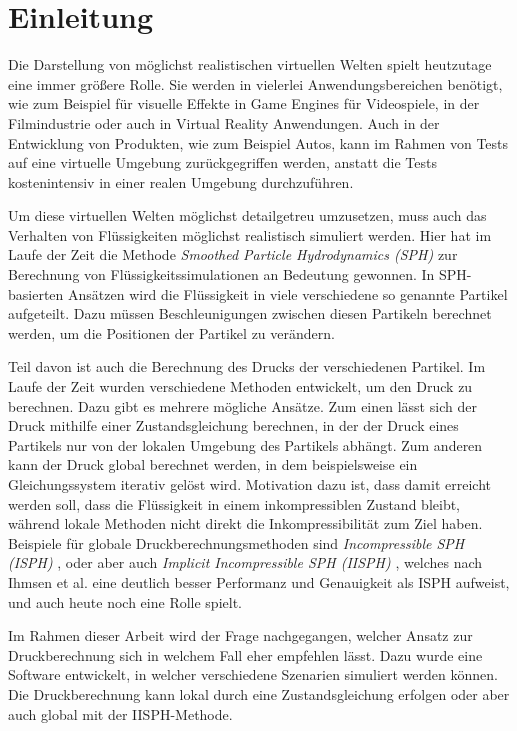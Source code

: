 \documentclass[11pt,
a4paper,
parskip=half, %
BCOR=10mm, %
english,
ngerman]{scrreprt}
\begin{document}
\chapter{Einleitung}
Die Darstellung von möglichst realistischen virtuellen Welten spielt heutzutage eine immer größere Rolle.
Sie werden in vielerlei Anwendungsbereichen benötigt,
wie zum Beispiel für visuelle Effekte in Game Engines für Videospiele, in der Filmindustrie oder auch in Virtual Reality Anwendungen.
Auch in der Entwicklung von Produkten, wie zum Beispiel Autos, kann im Rahmen von Tests auf eine virtuelle Umgebung zurückgegriffen werden,
anstatt die Tests kostenintensiv in einer realen Umgebung durchzuführen.

Um diese virtuellen Welten möglichst detailgetreu umzusetzen, muss auch das Verhalten von Flüssigkeiten möglichst realistisch simuliert werden.
Hier hat im Laufe der Zeit die Methode \textit{Smoothed Particle Hydrodynamics (SPH)} zur Berechnung von Flüssigkeitssimulationen an Bedeutung gewonnen.
In SPH-basierten Ansätzen wird die Flüssigkeit in viele verschiedene so genannte Partikel aufgeteilt.
Dazu müssen Beschleunigungen zwischen diesen Partikeln berechnet werden, um die Positionen der Partikel zu verändern.

Teil davon ist auch die Berechnung des Drucks der verschiedenen Partikel.
Im Laufe der Zeit wurden verschiedene Methoden entwickelt, um den Druck zu berechnen.
Dazu gibt es mehrere mögliche Ansätze.
Zum einen lässt sich der Druck mithilfe einer Zustandsgleichung berechnen, in der der Druck eines Partikels nur von der lokalen Umgebung des Partikels abhängt.
Zum anderen kann der Druck global berechnet werden, in dem beispielsweise ein Gleichungssystem iterativ gelöst wird.
Motivation dazu ist, dass damit erreicht werden soll, dass die Flüssigkeit in einem inkompressiblen Zustand bleibt,
während lokale Methoden nicht direkt die Inkompressibilität zum Ziel haben.
Beispiele für globale Druckberechnungsmethoden sind \textit{Incompressible SPH (ISPH)} \cite{shao_incompressible_2003}, 
oder aber auch \textit{Implicit Incompressible SPH (IISPH)} \cite{ihmsen_implicit_2014},
welches nach Ihmsen et al. \cite{ihmsen_implicit_2014} eine deutlich besser Performanz und Genauigkeit als ISPH aufweist, und auch heute noch eine Rolle spielt. 

Im Rahmen dieser Arbeit wird der Frage nachgegangen, welcher Ansatz zur Druckberechnung sich in welchem Fall eher empfehlen lässt.
Dazu wurde eine Software entwickelt, in welcher verschiedene Szenarien simuliert werden können.
Die Druckberechnung kann lokal durch eine Zustandsgleichung erfolgen oder aber auch global mit der IISPH-Methode.
\end{document}
